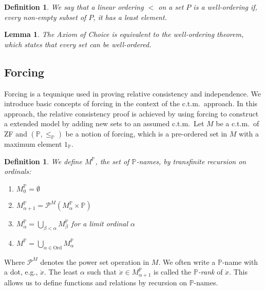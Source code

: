 \documentclass{report}
\newtheorem{lem}[thm]{Lemma}
\newtheorem{dfn}[thm]{Definition}
\begin{document}
\begin{dfn}
  We say that a linear ordering $<$ on a set $P$ is a \emph{well-ordering} if, every non-empty subset of $P$, it has a least element.
\end{dfn}

\begin{lem}
  The Axiom of Choice is equivalent to the well-ordering theorem, which states that every set can be well-ordered.
\end{lem}


\subsection{Forcing}
Forcing is a tequnique used in proving relative consistency and independence.
We introduce basic concepts of forcing in the context of the c.t.m.\  approach.
In this approach, the relative consistency proof is achieved by using forcing to construct a extended model by adding new sets to an assumed c.t.m.\ 
Let $M$ be a c.t.m.\  of ZF and $(\mathbb{P}, \leq_{\mathbb{P}})$ be a notion of forcing, which is a pre-ordered set in $M$ with a maximum element $1_{\mathbb{P}}$.

\begin{dfn}
  We define $M^{\mathbb{P}}$, the set of \emph{$\mathbb{P}$-names}, by transfinite recursion on ordinals:
  \begin{enumerate}
    \item $M^{\mathbb{P}}_0 = \emptyset$
    \item $M^{\mathbb{P}}_{\alpha + 1} = \mathcal{P}^M(M^{\mathbb{P}}_{\alpha} \times \mathbb{P})$
    \item $M^{\mathbb{P}}_{\alpha} = \bigcup_{\beta < \alpha} M^{\mathbb{P}}_{\beta}$ for a limit ordinal $\alpha$
    \item $M^{\mathbb{P}} = \bigcup_{\alpha \in \mathrm{Ord}} M^{\mathbb{P}}_{\alpha}$
  \end{enumerate}
\end{dfn}
Where $\mathcal{P}^M$ denotes the power set operation in $M$. 
We often write a $\mathbb{P}$-name with a dot, e.g., $\dot{x}$.
The least $\alpha$ such that $\dot{x} \in M^{\mathbb{P}}_{\alpha + 1}$ is called the \emph{$\mathbb{P}$-rank} of $\dot{x}$.
This allows us to define functions and relations by recursion on $\mathbb{P}$-names.
\end{document}
